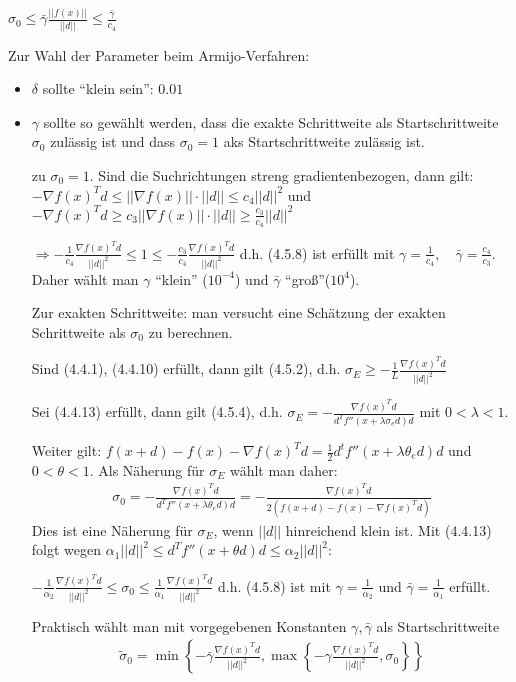 \documentclass[ngerman,halfparskip]{scrartcl}
\theoremstyle{definition}
\begin{document}
$\sigma_0 \leq \bar\gamma \frac{||f(x)||}{||d||}\leq \frac {\bar\gamma}{c_4}$

Zur Wahl der Parameter beim Armijo-Verfahren:
\begin{itemize}
\item $\delta$ sollte "`klein sein"': $0.01$
\item $\gamma$ sollte so gewählt werden, dass die exakte Schrittweite als Startschrittweite $\sigma_0$ zulässig ist und dass $\sigma_0=1$ aks Startschrittweite zulässig ist.

zu $\sigma_0=1$. Sind die Suchrichtungen streng gradientenbezogen, dann gilt: $-\nabla f(x)^Td\leq ||\nabla f(x)||\cdot ||d|| \leq c_4 ||d||^2$ und $-\nabla f(x)^Td\geq c_3||\nabla f(x)||\cdot ||d|| \geq \frac{c_3}{c_4} ||d||^2$

$\Rightarrow -\frac 1{c_4} \frac {\nabla f(x)^Td}{||d||^2}\leq 1 \leq -\frac {c_3}{c_4} \frac {\nabla f(x)^Td}{||d||^2}$ d.h. (4.5.8) ist erfüllt mit $\gamma=\frac 1{c_4},\quad \bar\gamma=\frac{c_4}{c_3}$. Daher wählt man $\gamma$ "`klein"' ($10^{-4}$) und $\bar\gamma$ "`groß"'($10^4$).

Zur exakten Schrittweite: man versucht eine Schätzung der exakten Schrittweite als $\sigma_0$ zu berechnen.

Sind (4.4.1), (4.4.10) erfüllt, dann gilt (4.5.2), d.h. $\sigma_E\geq -\frac 1L \frac {\nabla f(x)^Td}{||d||^2}$

Sei (4.4.13) erfüllt, dann gilt (4.5.4), d.h. $\sigma_E=-\frac {\nabla f(x)^Td}{d^Tf''(x+\lambda\sigma_e d)d}$ mit $0<\lambda < 1$.

Weiter gilt: $f(x+d)-f(x)-\nabla f(x)^Td=\frac 12 d^tf''(x+\lambda \theta _e d)d$ und $0<\theta<1$. Als Näherung für $\sigma_E$ wählt man daher:
\begin{gather*}\tag{4.5.9}
\sigma_0=- \frac {\nabla f(x)^Td}{d^Tf''(x+\lambda\theta_e d)d}=-\frac {\nabla f(x)^Td}{2(f(x+d)-f(x)-\nabla f(x)^Td)}
\end{gather*}
Dies ist eine Näherung für $\sigma_E$, wenn $||d||$ hinreichend klein ist. Mit (4.4.13) folgt wegen $\alpha_1||d||^2\leq d^T f''(x+\theta d)d \leq \alpha_2 ||d||^2$:

$-\frac 1{\alpha_2} \frac {\nabla f(x)^Td}{||d||^2} \leq \sigma_0 \leq \frac 1{\alpha_1}\frac {\nabla f(x)^Td}{||d||^2}$ d.h. (4.5.8) ist mit $\gamma=\frac 1{\alpha_2}$ und $\bar\gamma=\frac 1{\alpha_1}$ erfüllt. 

Praktisch wählt man mit vorgegebenen Konstanten $\gamma,\bar\gamma$ als Startschrittweite
\begin{gather*}\tag{4.5.10}
\tilde\sigma_0=\min \left\{-\bar \gamma \frac {\nabla f(x)^Td}{||d||^2}, \max \left\{-\gamma \frac {\nabla f(x)^Td}{||d||^2},\sigma_0 \right\}\right\}
\end{gather*}
\end{itemize}
\end{document}
